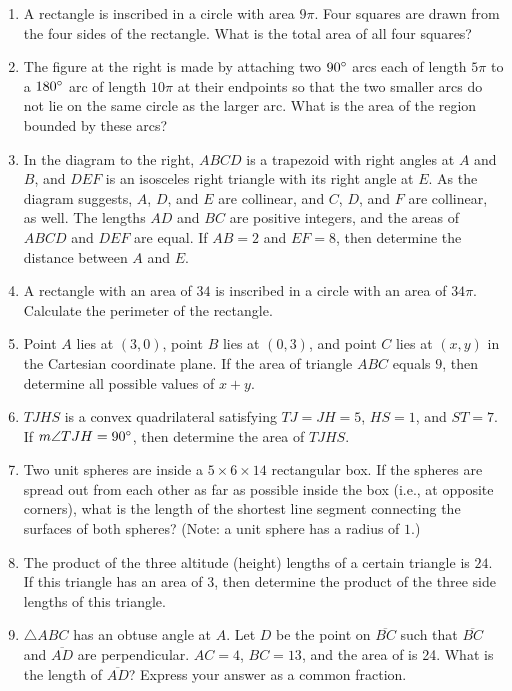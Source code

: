 \documentclass[11pt]{article}
\begin{document}
\begin{enumerate}[1.]
			\item A rectangle is inscribed in a circle with area $9\pi$. Four squares are drawn from the four sides of the rectangle. What is the total area of all four squares?
			
			\item The figure at the right is made by attaching two $90\degree$ arcs each of length $5\pi$ to a $180\degree$ arc of length $10\pi$ at their endpoints so that the two smaller arcs do not lie on the same circle as the larger arc. What is the area of the region bounded by these arcs?
			
			\item In the diagram to the right, $ABCD$ is a trapezoid with right angles at $A$ and $B$, and $DEF$ is an isosceles right triangle with its right angle at $E$. As the diagram suggests, $A$, $D$, and $E$ are collinear, and $C$, $D$, and $F$ are collinear, as well. The lengths $AD$ and $BC$ are positive integers, and the areas of $ABCD$ and $DEF$ are equal. If $AB = 2$ and $EF = 8$, then determine the distance between $A$ and $E$.
			
			\item A rectangle with an area of $34$ is inscribed in a circle with an area of $34\pi$. Calculate the perimeter of the rectangle.
			
			\item Point $A$ lies at $(3, 0)$, point $B$ lies at $(0, 3)$, and point $C$ lies at $(x, y)$ in the Cartesian coordinate plane. If the area of triangle $ABC$ equals $9$, then determine all possible values of $x + y$.
			
			\item $TJHS$ is a convex quadrilateral satisfying $TJ = JH = 5$, $HS = 1$, and $ST = 7$. If $m\angle TJH = 90\degree$, then determine the area of $TJHS$.
			
			\item Two unit spheres are inside a $5 \times 6 \times 14$ rectangular box. If the spheres are spread out from each other as far as possible inside the box (i.e., at opposite corners), what is the length of the shortest line segment connecting the surfaces of both spheres? (Note: a unit sphere has a radius of $1$.)
			
			\item The product of the three altitude (height) lengths of a certain triangle is $24$. If this triangle has an area of $3$, then determine the product of the three side lengths of this triangle.
			
			\item $\triangle ABC$ has an obtuse angle at $A$. Let $D$ be the point on $\overline{BC}$ such that $\overline{BC}$ and $\overline{AD}$ are perpendicular. $AC = 4$, $BC = 13$, and the area of is 24. What is the length of $\overline{AD}$? Express your answer as a common fraction.
			

\end{enumerate}
\end{document}
